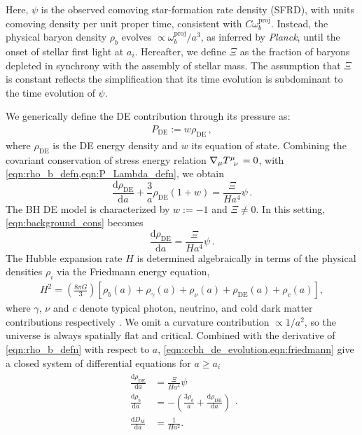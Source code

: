 \documentclass[a4paper,11pt]{article}
\renewcommand{\d}[0]{\mathrm{d}}
\begin{document}
Here, $\psi$ is the observed comoving star-formation rate density (SFRD), with units comoving density per unit proper time, consistent with $C\omega_b^\mathrm{proj}$.
Instead, the physical baryon density $\rho_b$ evolves $\propto \omega_b^\mathrm{proj}/a^3$, as inferred by \emph{Planck}, until the onset of stellar first light at $a_i$.
Hereafter, we define $\Xi$ as the fraction of baryons depleted in synchrony with the assembly of stellar mass.
The assumption that $\Xi$ is constant reflects the simplification that its time evolution is subdominant to the time evolution of $\psi$.

We generically define the DE contribution through its pressure as:
\begin{align}
  P_\mathrm{DE} := w \rho_\mathrm{DE} \,, \label{eqn:P_Lambda_defn}
\end{align}
where $\rho_\mathrm{DE}$ is the DE energy density and $w$ its equation of state.
Combining the covariant conservation of stress energy relation $\nabla_\mu \tensor{T}{^\mu_\nu} = 0$, with \cref{eqn:rho_b_defn,eqn:P_Lambda_defn}, we obtain
\begin{equation}
    \frac{\d \rho_\mathrm{DE}}{\d a} + \frac{3}{a}\rho_\mathrm{DE}(1+w) = \frac{\Xi}{Ha^4}\psi \,. \label{eqn:background_cons} 
\end{equation}
The BH DE model is characterized by $w := -1$ and $\Xi \neq 0$.
In this setting, \cref{eqn:background_cons} becomes
\begin{equation}
  \frac{\d \rho_\mathrm{DE}}{\d a} = \frac{\Xi}{Ha^4}\psi\,. \label{eqn:ccbh_de_evolution}
\end{equation}
The Hubble expansion rate $H$ is determined algebraically in terms of the physical densities $\rho_i$ via the Friedmann energy equation,
\begin{align}
  H^2 = \left(\frac{8\pi G}{3}\right)\left[\rho_b(a) + \rho_\gamma(a) + \rho_\nu(a) + \rho_\mathrm{DE}(a) + \rho_c(a)\right], \label{eqn:friedmann}
\end{align}
where $\gamma$, $\nu$ and $c$ denote typical photon, neutrino, and cold dark matter contributions respectively \cite[e.g.][]{dodelsoncosmology2020}.
We omit a curvature contribution $\propto 1/a^2$, so the universe is always spatially flat and critical.
Combined with the derivative of \cref{eqn:rho_b_defn} with respect to $a$, \cref{eqn:ccbh_de_evolution,eqn:friedmann} give a closed system of differential equations for $a \geqslant a_i$
\begin{align}
  \begin{split}
    \frac{\d \rho_\mathrm{DE}}{\d a} &= \frac{\Xi}{Ha^4}\psi\, \\
    \frac{\d \rho_b}{\d a} &= -\left(\frac{3\rho_b}{a} + \frac{\d \rho_\mathrm{DE}}{\d a}\right) \\
    \frac{\d D_\mathrm{M}}{\d a} &= \frac{1}{H a^2}.
  \end{split}. \label{eqn:ode_system}
\end{align}
\end{document}
